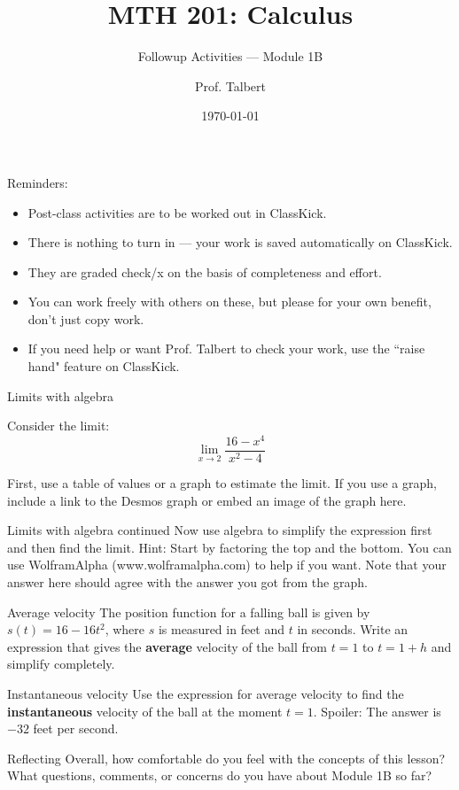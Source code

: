 \documentclass{beamer}
\title{MTH 201: Calculus}
\subtitle{Followup Activities --- Module 1B}
\author{Prof. Talbert}
\institute{GVSU}
\date{\today}
\begin{document}
\frame{\titlepage}

\begin{frame}{Reminders:}

    \begin{itemize}
        \item Post-class activities are to be worked out in ClassKick.
        \item There is nothing to turn in --- your work is saved automatically on ClassKick. 
        \item They are graded check/x on the basis of completeness and effort. 
        \item You can work freely with others on these, but please for your own benefit, don't just copy work. 
        \item If you need help or want Prof. Talbert to check your work, use the ``raise hand" feature on ClassKick. 
    \end{itemize}
    
    \end{frame}

\begin{frame}[t]{Limits with algebra}

    Consider the limit: 
        $$\lim_{x \to 2} \frac{16-x^4}{x^2-4}$$
        
     First, use a table of values or a graph to estimate the limit. If you use a graph, include a link to the Desmos graph or embed an image of the graph here. 
\end{frame}
        
\begin{frame}[t]{Limits with algebra continued}
    Now use algebra to simplify the expression first and then find the limit. Hint: Start by factoring the top and the bottom. You can use WolframAlpha (www.wolframalpha.com) to help if you want. Note that your answer here should agree with the answer you got from the graph. 
        
    \end{frame}

\begin{frame}[t]{Average velocity}
        The position function for a falling ball is given by $s(t) = 16 - 16t^2$, where $s$ is measured in feet and $t$ in seconds. Write an expression that gives the \textbf{average} velocity of the ball from $t=1$ to $t = 1+h$ and simplify completely. 
\end{frame}
        
\begin{frame}[t]{Instantaneous velocity}
        Use the expression for average velocity to find the \textbf{instantaneous} velocity of the ball at the moment $t=1$. Spoiler: The answer is $-32$ feet per second. 
\end{frame}
        
\begin{frame}[t]{Reflecting}
    Overall, how comfortable do you feel with the concepts of this lesson? What questions, comments, or concerns do you have about Module 1B so far?     
        
        
    \end{frame}
    
\end{document}
